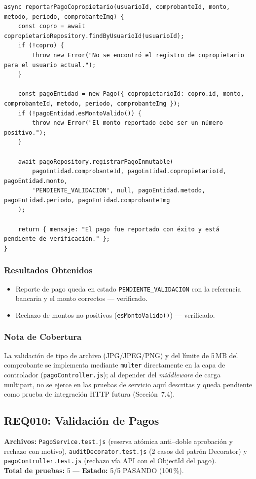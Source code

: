 \documentclass[12pt,a4paper]{article}
\begin{document}
\begin{lstlisting}[caption={\texttt{reportarPagoCopropietario} (\texttt{PagoService.js})}]
async reportarPagoCopropietario(usuarioId, comprobanteId, monto, metodo, periodo, comprobanteImg) {
    const copro = await copropietarioRepository.findByUsuarioId(usuarioId);
    if (!copro) {
        throw new Error("No se encontró el registro de copropietario para el usuario actual.");
    }

    const pagoEntidad = new Pago({ copropietarioId: copro.id, monto, comprobanteId, metodo, periodo, comprobanteImg });
    if (!pagoEntidad.esMontoValido()) {
        throw new Error("El monto reportado debe ser un número positivo.");
    }

    await pagoRepository.registrarPagoInmutable(
        pagoEntidad.comprobanteId, pagoEntidad.copropietarioId, pagoEntidad.monto,
        'PENDIENTE_VALIDACION', null, pagoEntidad.metodo, pagoEntidad.periodo, pagoEntidad.comprobanteImg
    );

    return { mensaje: "El pago fue reportado con éxito y está pendiente de verificación." };
}
\end{lstlisting}

\subsubsection*{Resultados Obtenidos}
\begin{itemize}[nosep]
    \item Reporte de pago queda en estado \texttt{PENDIENTE\_VALIDACION} con la referencia
    bancaria y el monto correctos — verificado.
    \item Rechazo de montos no positivos (\texttt{esMontoValido()}) — verificado.
\end{itemize}

\subsubsection*{Nota de Cobertura}
La validación de tipo de archivo (JPG/JPEG/PNG) y del límite de 5\,MB del comprobante
se implementa mediante \texttt{multer} directamente en la capa de controlador
(\texttt{pagoController.js}); al depender del \emph{middleware} de carga multipart, no se
ejerce en las pruebas de servicio aquí descritas y queda pendiente como prueba de
integración HTTP futura (Sección~7.4).

\subsection{REQ010: Validación de Pagos}
\textbf{Archivos:} \texttt{PagoService.test.js} (reserva atómica anti–doble aprobación y
rechazo con motivo), \texttt{auditDecorator.test.js} (2 casos del patrón Decorator) y
\texttt{pagoController.test.js} (rechazo vía API con el ObjectId del pago).\\
\textbf{Total de pruebas:} 5 — \textbf{Estado:} 5/5 PASANDO (100\,\%).
\end{document}
